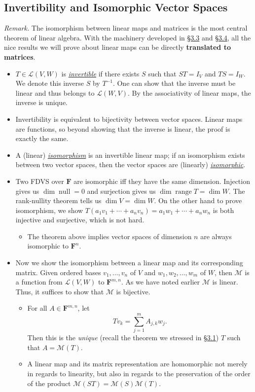 \documentclass[11pt]{article}
\newcommand{\lk}[2]{\hyperlink{subsection.#1.#2}{\S#1.#2}}
\newcommand{\df}[1]{\ul{\textit{\textsf{#1}}}}
\newcommand{\F}{\mathbf{F}}
\newcommand{\n}{\operatorname{null}}
\renewcommand{\r}{\operatorname{range}}
\renewcommand{\d}{\dim}
\newcommand{\LVW}{\mathcal{L}(V,W)}
\newcommand{\M}{\mathcal{M}}
\newcommand{\bv}{v_1,\dots,v_n}
\begin{document}
\subsection{Invertibility and Isomorphic Vector Spaces}
\textit{Remark.} The isomorphism between linear maps and matrices is the most central theorem of linear algebra. With the machinery developed in \lk{3}{3} and \lk{3}{4}, all the nice results we will prove about linear maps can be directly \textbf{translated to matrices}.
\begin{itemize}
    \item $T \in \LVW$ is \df{invertible} if there exists $S$ such that $ST = I_V$ and $TS = I_W$. We denote this inverse $S$ by $T^{-1}$. One can show that the inverse must be linear and thus belongs to $\mathcal{L}(W,V)$. By the associativity of linear maps, the inverse is unique.
    \item Invertibility is equivalent to bijectivity between vector spaces. Linear maps are functions, so beyond showing that the inverse is linear, the proof is exactly the same.
    \item A (linear) \df{isomorphism} is an invertible linear map; if an isomorphism exists between two vector spaces, then the vector spaces are (linearly) \df{isomorphic}.
    \item Two FDVS over $\F$ are isomorphic iff they have the same dimension. Injection gives us $\d \n = 0$ and surjection gives us $\d \r T = \d W$. The rank-nullity theorem tells us $\d V = \d W$. On the other hand to prove isomorphism, we show $T(a_1v_1+\cdots+a_nv_n) = a_1w_1+\cdots+a_nw_n$ is both injective and surjective, which is not hard.
    \begin{itemize}
        \item The theorem above implies vector spaces of dimension $n$ are always isomorphic to $\F^n$.
    \end{itemize}
    \item Now we show the isomorphism between a linear map and its corresponding matrix. Given ordered bases $\bv$ of $V$ and $w_1,w_2,\dots,w_m$ of $W$, then $\M$ is a function from $\LVW$ to $\F^{m,n}$. As we have noted earlier $\M$ is linear. Thus, it suffices to show that $\M$ is bijective.
    \begin{itemize}
        \item For all $A \in \F^{m,n}$, let $$Tv_k = \sum_{j = 1}^m A_{j,k}w_j.$$ Then this is the \emph{unique} (recall the theorem we stressed in \lk{3}{1}) $T$ such that $A = \M(T)$.
        \item A linear map and its matrix representation are homomorphic not merely in regards to linearity, but also in regards to the preservation of the order of the product $\M(ST) = \M(S)\M(T)$.

\end{itemize}
\end{itemize}
\end{document}
